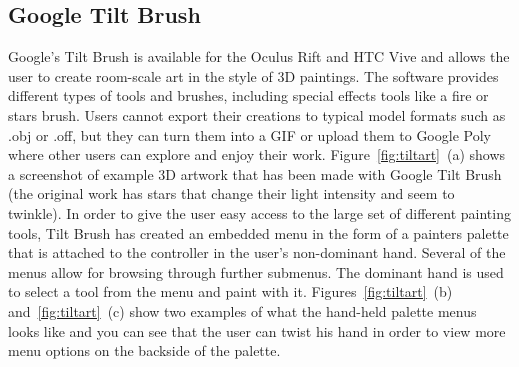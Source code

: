 \subsection{Google Tilt Brush}
Google's Tilt Brush is available for the Oculus Rift and HTC Vive and allows the user to  create room-scale art in the style of 3D paintings. The software provides different types of tools and brushes, including special effects tools like a fire or stars brush. Users cannot export their creations to typical model formats such as .obj or .off, but they can turn them into a GIF or upload them to Google Poly where other users can explore and enjoy their work.
Figure~\ref{fig:tiltart}~(a) shows a screenshot of example 3D artwork that has been made with Google Tilt Brush (the original work has stars that change their light intensity and seem to twinkle). In order to give the user easy access to the large set of different painting tools, Tilt Brush has created an embedded menu in the form of a painters palette that is attached to the controller in the user's non-dominant hand. Several of the menus allow for browsing through further submenus. The dominant hand is used to select a tool from the menu and paint with it. Figures~\ref{fig:tiltart}~(b) and~\ref{fig:tiltart}~(c) show two examples of what the hand-held palette menus looks like and you can see that the user can twist his hand in order to view more menu options on the backside of the palette.

